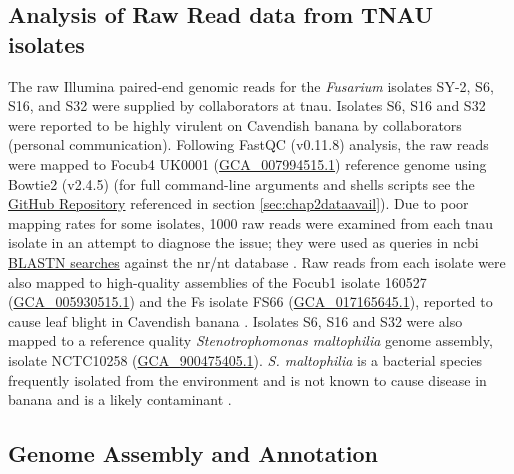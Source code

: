 \subsection{Analysis of Raw Read data from TNAU isolates}

The raw Illumina paired-end genomic reads for the \textit{Fusarium} isolates SY-2, S6, S16, and S32 were supplied by collaborators at \ac{tnau}. Isolates S6, S16 and S32 were reported to be highly virulent on Cavendish banana by collaborators (personal communication). Following FastQC (v0.11.8)
\parencite{Andrews2010} analysis, the raw reads were mapped to \ac{Focub4} UK0001 (\href{https://www.ncbi.nlm.nih.gov/datasets/genome/GCA_007994515.1/}{GCA\_007994515.1}) \parencite{Warmington2019} reference genome using Bowtie2 (v2.4.5) \parencite{Langmead2012} (for full command-line arguments and shells scripts see the \href{https://github.com/JamiePike/NewTools-Project/blob/master/docs/Assembly/AssemblyNotes.md}{GitHub Repository} referenced in section \ref{sec:chap2dataavail}). Due to poor mapping rates for some isolates, 1000 raw reads were examined from each \ac{tnau} isolate in an attempt to diagnose the issue; they were used as queries in  \ac{ncbi} \href{https://blast.ncbi.nlm.nih.gov/Blast.cgi?PROGRAM=blastn&BLAST_SPEC=GeoBlast&PAGE_TYPE=BlastSearch}{BLASTN searches} against the nr/nt database \parencite{Nih2014}. Raw reads from each isolate were also mapped to high-quality assemblies of the \ac{Focub1} isolate 160527 (\href{https://www.ncbi.nlm.nih.gov/datasets/genome/GCA_005930515.1/}{GCA\_005930515.1}) \parencite{Asai2019} and the \acl{Fs} isolate FS66 (\href{https://www.ncbi.nlm.nih.gov/datasets/genome/GCA_017165645.1/}{GCA\_017165645.1}), reported to cause leaf blight in Cavendish banana \parencite{Cui2021}. Isolates S6, S16 and S32 were also mapped to a reference quality \textit{Stenotrophomonas maltophilia} genome assembly, isolate NCTC10258 (\href{https://www.ncbi.nlm.nih.gov/datasets/genome/GCF_900475405.1/}{GCA\_900475405.1}). \textit{S. maltophilia} is a bacterial species frequently isolated from the environment and is not known to cause disease in banana and is a likely contaminant \parencite{said2021stenotrophomonas}.

\subsection{Genome Assembly and Annotation}

